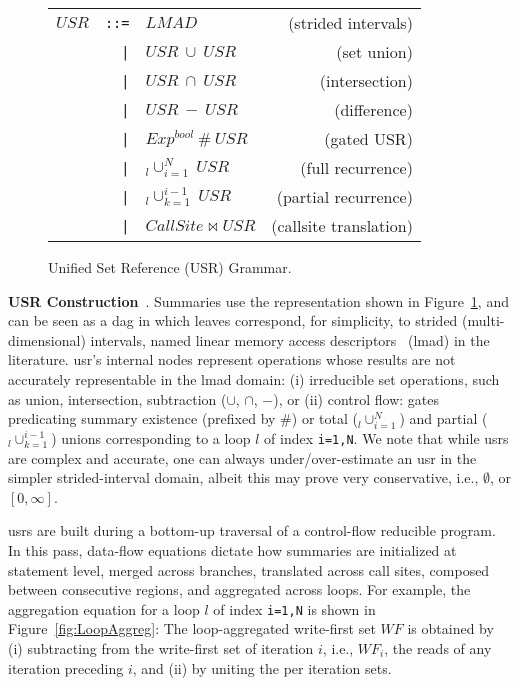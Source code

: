 \documentclass[10pt,nocopyrightspace]{sigplanconf}
\begin{document}
\begin{figure}[hbt]
\begin{tabular}{lclr}
$USR$ & {\tt::=} & $LMAD$            & (strided intervals)\\
      & {\tt~~|} & $USR \ \cup \ USR$ & (set union)\\
      & {\tt~~|} & $USR \ \cap \ USR$ & (intersection)\\
      & {\tt~~|} & $USR \ - \ USR$ & (difference)\\
      & {\tt~~|} & $Exp^{bool} \ \# \ USR$ & (gated USR)\\
      & {\tt~~|} & $_l\cup_{i=1}^{N} \ USR$ & (full recurrence)\\
      & {\tt~~|} & $_l\cup_{k=1}^{i-1} \ USR$ & (partial recurrence)\\
      & {\tt~~|} & $CallSite \bowtie USR$ & (callsite translation)
\end{tabular}
\caption{Unified Set Reference (USR) Grammar.}
\label{fig:USRgrammar}
\end{figure}

{\bf USR Construction}~\cite{HybAn}.
%
Summaries use the representation shown in Figure~\ref{fig:USRgrammar},
and can be seen as a {\sc dag} in which leaves correspond,
for simplicity, to strided (multi-dimensional) intervals, 
named linear memory access descriptors~\cite{LMAD} ({\sc lmad}) in the literature.
{\sc usr}'s internal nodes represent operations whose results are not
accurately representable in the {\sc lmad} domain: (i) irreducible set
operations, such as union, intersection, subtraction ($\cup$, $\cap$, $-$), 
or (ii) control flow: gates predicating
summary existence (prefixed by $\#$) or total ($_l\cup_{i=1}^N$) and partial 
($_l\cup_{k=1}^{i-1}$) unions corresponding to a loop $l$ of
index {\tt i=1,N}. 
%
We note that while {\sc usr}s are complex and accurate,
one can always under/over-estimate an {\sc usr} in the 
simpler strided-interval domain, albeit this may 
prove very conservative, i.e., $\emptyset$, or $[0,\infty]$. 


{\sc usr}s are built during a bottom-up traversal of a control-flow 
reducible program.
%
In this pass, data-flow equations dictate how summaries 
are initialized at statement level, merged across branches, 
translated across call sites, composed between consecutive 
regions, and aggregated across loops. 
%
For example, the aggregation equation for a loop $l$ of index 
{\tt i=1,N} is shown in Figure~\ref{fig:LoopAggreg}:
The loop-aggregated write-first set $WF$ is obtained 
by (i) subtracting from the write-first set of iteration 
$i$, i.e., $WF_i$, the reads of any iteration preceding $i$,
and (ii) by uniting the per iteration sets. 
\end{document}
